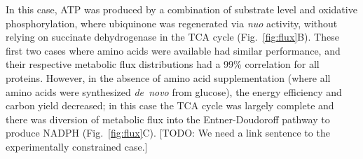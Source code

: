 \documentclass[journal=asbcd6,manuscript=article]{achemso}
\begin{document}
In this case, ATP was produced by a combination of substrate level and oxidative phosphorylation, where
ubiquinone was regenerated via \textit{nuo} activity, without relying on succinate dehydrogenase in the TCA cycle (Fig.~\ref{fig:flux}B).
These first two cases where amino acids were available had similar performance, and their respective metabolic flux distributions had a 99\% correlation for all proteins. However, in the absence of amino acid supplementation (where all amino acids were synthesized \textit{de~novo} from glucose),
the energy efficiency and carbon yield decreased; in this case the TCA cycle was largely complete and there was diversion of metabolic flux into the Entner-Doudoroff pathway to produce NADPH (Fig.~\ref{fig:flux}C). [TODO: We need a link sentence to the experimentally constrained case.]

\end{document}
